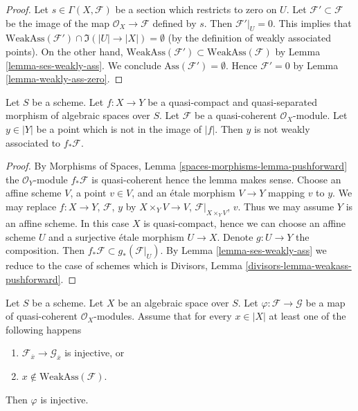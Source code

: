 \begin{proof}
Let $s \in \Gamma(X, \mathcal{F})$ be a section which restricts to zero on $U$.
Let $\mathcal{F}' \subset \mathcal{F}$ be the image of the map
$\mathcal{O}_X \to \mathcal{F}$ defined by $s$. Then $\mathcal{F}'|_U = 0$.
This implies that
$\text{WeakAss}(\mathcal{F}') \cap \Im(|U| \to |X|) = \emptyset$
(by the definition of weakly associated points).
On the other hand,
$\text{WeakAss}(\mathcal{F}') \subset \text{WeakAss}(\mathcal{F})$
by Lemma \ref{lemma-ses-weakly-ass}. We conclude
$\text{Ass}(\mathcal{F}') = \emptyset$.
Hence $\mathcal{F}' = 0$ by Lemma \ref{lemma-weakly-ass-zero}.
\end{proof}

\begin{lemma}
\label{lemma-weakass-pushforward}
Let $S$ be a scheme. Let $f : X \to Y$ be a quasi-compact and quasi-separated
morphism of algebraic spaces over $S$. Let $\mathcal{F}$ be a quasi-coherent
$\mathcal{O}_X$-module. Let $y \in |Y|$ be a point which is not in the
image of $|f|$. Then $y$ is not weakly associated to $f_*\mathcal{F}$.
\end{lemma}

\begin{proof}
By Morphisms of Spaces, Lemma \ref{spaces-morphisms-lemma-pushforward}
the $\mathcal{O}_Y$-module $f_*\mathcal{F}$ is quasi-coherent hence
the lemma makes sense.
Choose an affine scheme $V$, a point $v \in V$, and an \'etale morphism
$V \to Y$ mapping $v$ to $y$. We may replace
$f : X \to Y$, $\mathcal{F}$, $y$ by
$X \times_Y V \to V$, $\mathcal{F}|_{X \times_Y V}$, $v$.
Thus we may assume $Y$ is an affine scheme.
In this case $X$ is quasi-compact, hence we can choose
an affine scheme $U$ and a surjective \'etale morphism $U \to X$.
Denote $g : U \to Y$ the composition.
Then $f_*\mathcal{F} \subset g_*(\mathcal{F}|_U)$.
By Lemma \ref{lemma-ses-weakly-ass}
we reduce to the case of schemes which is
Divisors, Lemma \ref{divisors-lemma-weakass-pushforward}.
\end{proof}

\begin{lemma}
\label{lemma-check-injective-on-weakass}
Let $S$ be a scheme. Let $X$ be an algebraic space over $S$.
Let $\varphi : \mathcal{F} \to \mathcal{G}$ be a map of
quasi-coherent $\mathcal{O}_X$-modules. Assume that for every
$x \in |X|$ at least one of the following happens
\begin{enumerate}
\item $\mathcal{F}_{\overline{x}} \to \mathcal{G}_{\overline{x}}$
is injective, or
\item $x \not \in \text{WeakAss}(\mathcal{F})$.
\end{enumerate}
Then $\varphi$ is injective.
\end{lemma}

